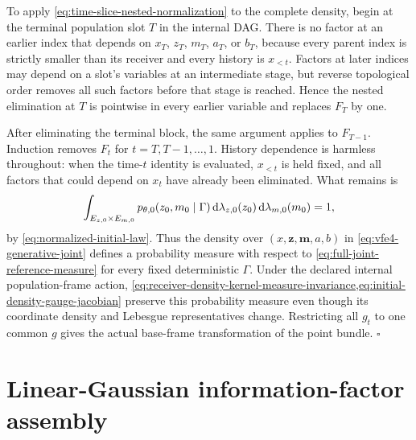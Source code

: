 To apply \cref{eq:time-slice-nested-normalization} to the complete density, begin at the terminal population slot $T$ in the internal DAG. There is no factor at an earlier index that depends on $x_T$, $z_T$, $m_T$, $a_T$, or $b_T$, because every parent index is strictly smaller than its receiver and every history is $x_{<t}$. Factors at later indices may depend on a slot's variables at an intermediate stage, but reverse topological order removes all such factors before that stage is reached. Hence the nested elimination at $T$ is pointwise in every earlier variable and replaces $F_T$ by one.

After eliminating the terminal block, the same argument applies to $F_{T-1}$.  Induction removes $F_t$ for $t=T,T-1,\ldots,1$.  History dependence is harmless throughout: when the time-$t$ identity is evaluated, $x_{<t}$ is held fixed, and all factors that could depend on $x_t$ have already been eliminated.  What remains is
\begin{equation}
\int_{E_{z,0}\times E_{m,0}}
p_{\theta,0}(z_0,m_0\mid\Gamma)
\mathop{\mathrm d\lambda_{z,0}(z_0)}
\mathop{\mathrm d\lambda_{m,0}(m_0)}
=1,
\label{eq:normalization-proof-initial-remainder}
\end{equation}
by \cref{eq:normalized-initial-law}. Thus the density over $(x,\boldsymbol z,\boldsymbol m,a,b)$ in \cref{eq:vfe4-generative-joint} defines a probability measure with respect to \cref{eq:full-joint-reference-measure} for every fixed deterministic $\Gamma$. Under the declared internal population-frame action, \cref{eq:receiver-density-kernel-measure-invariance,eq:initial-density-gauge-jacobian} preserve this probability measure even though its coordinate density and Lebesgue representatives change. Restricting all $g_t$ to one common $g$ gives the actual base-frame transformation of the point bundle. \hfill$\square$

\section{Linear-Gaussian information-factor assembly}

